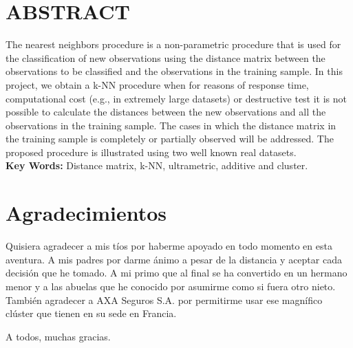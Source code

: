 \documentclass[12pt]{report} %
\theoremstyle{definition}
\begin{document}

\vfill
\newpage %
\thispagestyle{empty}	
\mbox{}

\chapter*{ABSTRACT}
\setcounter{page}{3}
The nearest neighbors procedure is a non-parametric procedure that is used for the classification of new observations using the distance matrix between the observations to be classified and the observations in the training sample. In this project, we obtain a k-NN procedure when for reasons of response time, computational cost (e.g., in extremely large datasets) or destructive test it is not possible to calculate the distances between the new observations and all the observations in the training sample. The cases in which the distance matrix in the training sample is completely or partially observed will be addressed. The proposed procedure is illustrated using two well known real datasets.\\ 

\textbf{Key Words:} Distance matrix, k-NN, ultrametric, additive and cluster.
\vfill
\newpage %
\thispagestyle{empty}
\mbox{}


\chapter*{Agradecimientos}
\setcounter{page}{5}
Quisiera agradecer a mis tíos por haberme apoyado en todo momento en esta aventura. A mis padres por darme ánimo a pesar de la distancia y aceptar cada decisión que he tomado. A mi primo que al final se ha convertido en un hermano menor y a las abuelas que he conocido por asumirme como si fuera otro nieto. También agradecer a AXA Seguros S.A. por permitirme usar ese magnífico clúster que tienen en su sede en Francia.\\
\begin{flushright}
	A todos, muchas gracias.
\end{flushright}
\vfill
\newpage %
\thispagestyle{empty}
\mbox{}


\end{document}
